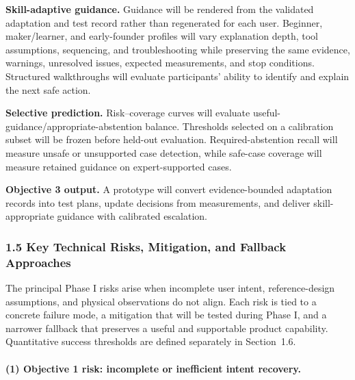 \documentclass[11pt,letterpaper]{article}
\begin{document}
\textbf{Skill-adaptive guidance.} Guidance will be rendered from the validated adaptation and test record rather than regenerated for each user. Beginner, maker/learner, and early-founder profiles will vary explanation depth, tool assumptions, sequencing, and troubleshooting while preserving the same evidence, warnings, unresolved issues, expected measurements, and stop conditions. Structured walkthroughs will evaluate participants' ability to identify and explain the next safe action.

\textbf{Selective prediction.} Risk--coverage curves will evaluate useful-guidance/appropriate-abstention balance. Thresholds selected on a calibration subset will be frozen before held-out evaluation. Required-abstention recall will measure unsafe or unsupported case detection, while safe-case coverage will measure retained guidance on expert-supported cases.


\textbf{Objective 3 output.} A prototype will convert evidence-bounded adaptation records into test plans, update decisions from measurements, and deliver skill-appropriate guidance with calibrated escalation.

\subsubsection*{1.5 Key Technical Risks, Mitigation, and Fallback Approaches}

The principal Phase I risks arise when incomplete user intent, reference-design assumptions, and physical observations do not align. Each risk is tied to a concrete failure mode, a mitigation that will be tested during Phase I, and a narrower fallback that preserves a useful and supportable product capability. Quantitative success thresholds are defined separately in Section~1.6.

\paragraph{(1) Objective 1 risk: incomplete or inefficient intent recovery.}~{} 
\end{document}
